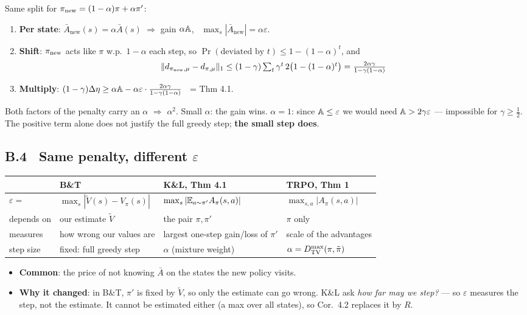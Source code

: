 Same split for $\pi_{\mathrm{new}}=(1-\alpha)\pi+\alpha\pi'$:
\begin{enumerate}
  \item \textbf{Per state}: $\bar A_{\mathrm{new}}(s)=\alpha\bar A(s)$ $\Rightarrow$ gain $\alpha\mathbb{A}$, \ $\max_s|\bar A_{\mathrm{new}}|=\alpha\varepsilon$.
  \item \textbf{Shift}: $\pi_{\mathrm{new}}$ acts like $\pi$ w.p.\ $1-\alpha$ each step, so $\Pr(\text{deviated by }t)\le1-(1-\alpha)^t$, and
  \begin{gather*}
    \|d_{\pi_{\mathrm{new}},\mu}-d_{\pi,\mu}\|_1 \le (1-\gamma)\textstyle\sum_t\gamma^t\,2\big(1-(1-\alpha)^t\big) = \frac{2\alpha\gamma}{1-\gamma(1-\alpha)}
  \end{gather*}
  \item \textbf{Multiply}: $(1-\gamma)\Delta\eta \ge \alpha\mathbb{A} - \alpha\varepsilon\cdot\frac{2\alpha\gamma}{1-\gamma(1-\alpha)}$ \ = Thm 4.1.
\end{enumerate}
\begin{keybox}
Both factors of the penalty carry an $\alpha$ $\Rightarrow$ $\alpha^2$. Small $\alpha$: the gain wins. $\alpha=1$: since $\mathbb{A}\le\varepsilon$ we would need $\mathbb{A}>2\gamma\varepsilon$ --- impossible for $\gamma\ge\frac12$. The positive term alone does not justify the full greedy step; \textbf{the small step does}.
\end{keybox}

\subsection*{B.4 \ Same penalty, different $\varepsilon$}

\begin{center}
\small
\begin{tabular}{l l l l}
\toprule
 & {\color{AtlasWarm}\textbf{B\&T}} & {\color{AtlasCool}\textbf{K\&L, Thm 4.1}} & \textbf{TRPO, Thm 1} \\
\midrule
$\varepsilon=$ & $\max_s|\tilde V(s)-V_\pi(s)|$ & $\max_s|\mathbb{E}_{a\sim\pi'}A_\pi(s,a)|$ & $\max_{s,a}|A_\pi(s,a)|$ \\
depends on & our estimate $\tilde V$ & the pair $\pi,\pi'$ & $\pi$ only \\
measures & how wrong our values are & largest one-step gain/loss of $\pi'$ & scale of the advantages \\
step size & fixed: full greedy step & $\alpha$ (mixture weight) & $\alpha=D_{\mathrm{TV}}^{\max}(\pi,\tilde\pi)$ \\
\bottomrule
\end{tabular}
\end{center}
\begin{itemize}
  \item \textbf{Common}: the price of not knowing $\bar A$ on the states the new policy visits.
  \item \textbf{Why it changed}: in B\&T, $\pi'$ is fixed by $\tilde V$, so only the estimate can go wrong. K\&L ask \emph{how far may we step?} --- so $\varepsilon$ measures the step, not the estimate. It cannot be estimated either (a max over all states), so Cor.~4.2 replaces it by $R$.
\end{itemize}

